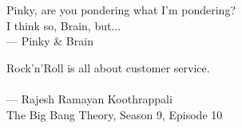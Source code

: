 \thispagestyle{empty}
{}

\vspace*{3cm}

\begin{center}
Pinky, are you pondering what I'm pondering? \\
\smallskip
I think so, Brain, but...
\\ \medskip
    --- Pinky \& Brain
\end{center}

\begin{center}
Rock'n'Roll is all about customer service. \\
\\ \medskip
    --- Rajesh Ramayan Koothrappali \\ The Big Bang Theory, Season 9, Episode 10
\end{center}

